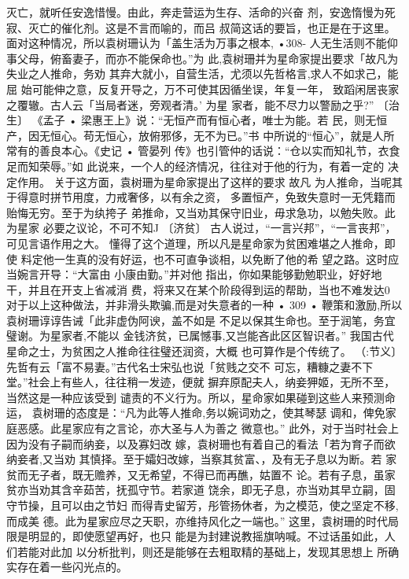 灭亡，就听任安逸惜慢。由此，奔走营运为生存、活命的兴奋
剂，安逸惰慢为死寂、灭亡的催化剂。这是不言而喻的，而吕
叔简这话的要旨，也正是在于这里。
面对这种情况，所以袁树珊认为「盖生活为万事之根本,
•308-
人无生活则不能仰事父母，俯畜妻子，而亦不能保命也。”为
此,袁树珊并为星命家提出要求「故凡为失业之人推命，务劝
其弃大就小，自营生活，尤须以先哲格言,求人不如求己，能屈
始可能伸之意，反复开导之，万不可使其因循坐误，年复一年，
致蹈闲居丧家之覆辙。古人云「当局者迷，旁观者清。' 为星
家者，能不尽力以警励之乎?”
〔治生〕
《孟子 • 梁惠王上》说：“无恒产而有恒心者，唯士为能。若
民，则无恒产，因无恒心。苟无恒心，放俯邪侈，无不为已。”书
中所说的“恒心”，就是人所常有的善良本心。《史记 • 管晏列
传》也引管仲的话说：“仓以实而知礼节，衣食足而知荣辱。”如
此说来，一个人的经济情况，往往对于他的行为，有着一定的
决定作用。
关于这方面，袁树珊为星命家提出了这样的要求 故凡
为人推命，当呢其于得意时拼节用度，力戒奢侈，以有余之资，
多置恒产，免致失意时一无凭籍而贻悔无穷。至于为纨挎子
弟推命，又当劝其保守旧业，毋求急功，以勉失败。此为星家
必要之议论，不可不知J
〔济贫〕
古人说过，“一言兴邦”，“一言丧邦”，可见言语作用之大。
懂得了这个道理，所以凡是星命家为贫困难堪之人推命，即使
料定他一生真的没有好运，也不可直争谈相，以免断了他的希
望之路。这时应当婉言开导：“大富由 小康由勤。”并对他
指出，你如果能够勤勉职业，好好地干，并且在开支上省减消
费，将来又在某个阶段得到运的帮助，当也不难发达0
对于以上这种做法，并非滑头欺骗,而是对失意者的一种
• 309 •
鞭策和激励,所以袁树珊谆谆告诫「此非虚伪阿谀，盖不如是
不足以保其生命也。至于润笔，务宜璧谢。为星家者,不能以
金钱济贫，已属憾事,又岂能吝此区区智识者。”
我国古代星命之士，为贫困之人推命往往璧还润资，大概
也可算作是个传统了。
（:节义〕
先哲有云「富不易妻。”古代名士宋弘也说「贫贱之交不
可忘，糟糠之妻不下堂。”社会上有些人，往往稍一发迹，便就
摒弃原配夫人，纳妾狎姬，无所不至，当然这是一种应该受到
谴责的不义行为。所以，星命家如果碰到这些人来预测命运，
袁树珊的态度是：“凡为此等人推命,务以婉词劝之，使其琴瑟
调和，俾免家庭恶感。此星家应有之言论，亦大圣与人为善之
微意也。”
此外，对于当时社会上因为没有子嗣而纳妾，以及寡妇改
嫁，袁树珊也有着自己的看法「若为育子而欲纳妾者,又当劝
其慎择。至于孀妇改嫁，当察其贫富、，及有无子息以为断。若
家贫而无子者，既无赡养，又无希望，不得已而再醮，姑置不
论。若有子息，虽家贫亦当劝其含辛茹苦，抚孤守节。若家道
饶余，即无子息，亦当劝其早立嗣，固守节操，且可以由之节妇
而得青史留芳，彤管扬休者，为之模范，使之坚定不移,而成美
德。此为星家应尽之天职，亦维持风化之一端也。”
这里，袁树珊的时代局限是明显的，即使愿望再好，也只
能是为封建说教摇旗呐喊。不过话虽如此，人们若能对此加
以分析批判，则还是能够在去粗取精的基础上，发现其思想上
所确实存在着一些闪光点的。
